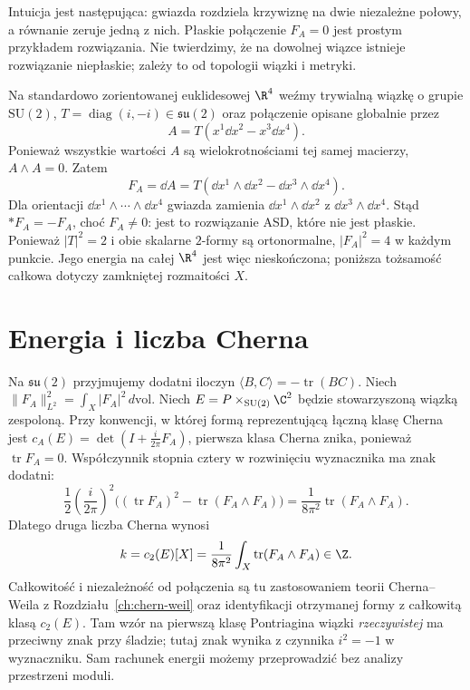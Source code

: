 Intuicja jest następująca: gwiazda rozdziela
krzywiznę na dwie niezależne połowy, a równanie
zeruje jedną z nich. Płaskie połączenie
$F_A=0$ jest prostym przykładem rozwiązania.
Nie twierdzimy, że na dowolnej wiązce istnieje
rozwiązanie niepłaskie; zależy to od topologii
wiązki i metryki.

\begin{przyklad}
\label{prz:donaldson-asd-lokalny}
Na standardowo zorientowanej euklidesowej $\R^4$
weźmy trywialną wiązkę o grupie $\mathrm{SU}(2)$,
$T=\operatorname{diag}(i,-i)\in\mathfrak{su}(2)$
oraz połączenie opisane globalnie przez
\[
 A=T(x^1\dd x^2-x^3\dd x^4).
\]
Ponieważ wszystkie wartości $A$ są wielokrotnościami
tej samej macierzy, $A\wedge A=0$. Zatem
\[
 F_A=\dd A
   =T(\dd x^1\wedge\dd x^2
       -\dd x^3\wedge\dd x^4).
\]
Dla orientacji $\dd x^1\wedge\cdots\wedge\dd x^4$
gwiazda zamienia $\dd x^1\wedge\dd x^2$
z $\dd x^3\wedge\dd x^4$. Stąd $*F_A=-F_A$,
choć $F_A\ne0$: jest to rozwiązanie ASD, które
nie jest płaskie. Ponieważ $|T|^2=2$ i obie
skalarne $2$-formy są ortonormalne, $|F_A|^2=4$
w każdym punkcie. Jego energia na całej $\R^4$
jest więc nieskończona; poniższa tożsamość
całkowa dotyczy zamkniętej rozmaitości $X$.
\end{przyklad}

\section{Energia i liczba Cherna}
\label{sec:donaldson-energia}

Na $\mathfrak{su}(2)$ przyjmujemy dodatni iloczyn
$\langle B,C\rangle=-\operatorname{tr}(BC)$.
Niech $\|F_A\|_{L^2}^2=\int_X|F_A|^2\,d\mathrm{vol}$.
Niech $E=P\times_{\mathrm{SU}(2)}\C^2$ będzie
stowarzyszoną wiązką zespoloną. Przy konwencji,
w której formą reprezentującą łączną klasę Cherna
jest $c_A(E)=\det(I+\frac{i}{2\pi}F_A)$, pierwsza
klasa Cherna znika, ponieważ $\operatorname{tr}F_A=0$.
Współczynnik stopnia cztery w rozwinięciu wyznacznika
ma znak dodatni:
\[
 \frac12\left(\frac{i}{2\pi}\right)^2
 \bigl((\operatorname{tr}F_A)^2
       -\operatorname{tr}(F_A\wedge F_A)\bigr)
 =\frac{1}{8\pi^2}\operatorname{tr}(F_A\wedge F_A).
\]
Dlatego druga liczba Cherna wynosi
\begin{equation}\label{eq:donaldson-c2}
 k=c_2(E)[X]
   =\frac{1}{8\pi^2}\int_X\operatorname{tr}(F_A\wedge F_A)
   \in\Z.
\end{equation}
Całkowitość i niezależność od połączenia są tu
zastosowaniem teorii Cherna--Weila z
Rozdziału~\ref{ch:chern-weil} oraz identyfikacji
otrzymanej formy z całkowitą klasą $c_2(E)$.
Tam wzór na pierwszą klasę Pontriagina wiązki
\emph{rzeczywistej} ma przeciwny znak przy śladzie;
tutaj znak wynika z czynnika $i^2=-1$ w wyznaczniku.
Sam rachunek energii możemy przeprowadzić bez
analizy przestrzeni moduli.

